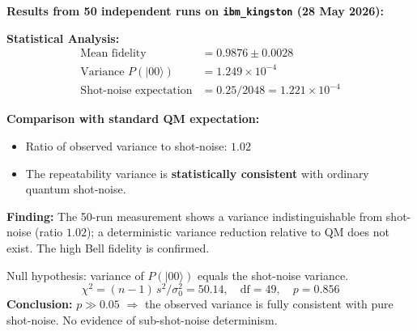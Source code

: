 \textbf{Results from 50 independent runs on \texttt{ibm\_kingston} (28 May 2026):}

\begin{table}[h]
	\centering
	\caption{Bell state fidelity: Experimental results (50 runs)}
	\label{tab:bell_fidelity}
\end{table}

\textbf{Statistical Analysis:}
\begin{align}
	\text{Mean fidelity} &= 0.9876 \pm 0.0028 \\
	\text{Variance } P(|00\rangle) &= 1.249 \times 10^{-4} \\
	\text{Shot-noise expectation} &= 0.25/2048 = 1.221 \times 10^{-4}
\end{align}

\textbf{Comparison with standard QM expectation:}
\begin{itemize}
	\item Ratio of observed variance to shot-noise: $1.02$
	\item The repeatability variance is \textbf{statistically consistent} with ordinary quantum shot-noise.
\end{itemize}

\begin{important}
	\textbf{Finding:} The 50-run measurement shows a variance indistinguishable from shot-noise (ratio $1.02$); a deterministic variance reduction relative to QM does not exist. The high Bell fidelity is confirmed.
\end{important}

\begin{keyresult}
	Null hypothesis: variance of $P(|00\rangle)$ equals the shot-noise variance.
	\begin{equation}
		\chi^2 = (n-1)\,s^2/\sigma_0^2 = 50.14, \quad \mathrm{df}=49, \quad p = 0.856
	\end{equation}
	\textbf{Conclusion:} $p \gg 0.05$ $\Rightarrow$ the observed variance is fully consistent with pure shot-noise. No evidence of sub-shot-noise determinism.
\end{keyresult}

